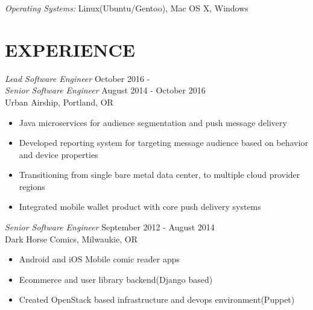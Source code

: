 \documentclass[margin]{res}
\begin{document}
\begin{resume}
		{\sl Operating Systems:} Linux(Ubuntu/Gentoo), Mac OS X, Windows
 
\section{EXPERIENCE} {\sl Lead Software Engineer} \hfill October 2016 -  \\
		{\sl Senior Software Engineer} \hfill August 2014 - October 2016 \\
                Urban Airship, Portland, OR 
                 \begin{itemize}  \itemsep -2pt %
                 	\item Java microservices for audience segmentation and push message delivery
                		\item Developed reporting system for targeting message audience based on behavior and device properties
			\item Transitioning from single bare metal data center, to multiple cloud provider regions
			\item Integrated mobile wallet product with core push delivery systems
               	\end{itemize}
                
                {\sl Senior Software Engineer} \hfill September 2012 - August 2014 \\
                Dark Horse Comics, Milwaukie, OR 
                 \begin{itemize}  \itemsep -2pt %
                 	\item Android and iOS Mobile comic reader apps
               		\item Ecommerce and user library backend(Django based)
              		\item Created OpenStack based infrastructure and devops environment(Puppet)
                \end{itemize}
                

\end{resume}
\end{document}
